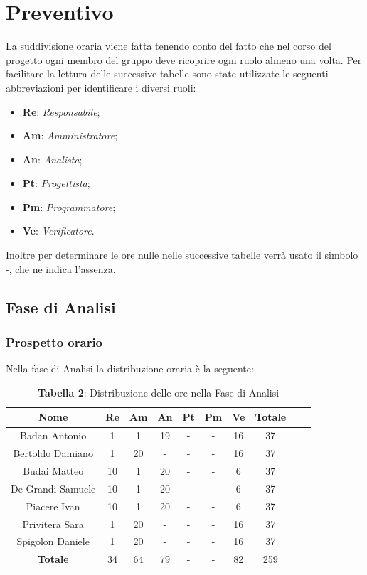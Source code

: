 \section{Preventivo}
La suddivisione oraria viene fatta tenendo conto del fatto che nel corso del progetto ogni  membro del gruppo deve ricoprire ogni ruolo almeno una volta.
Per facilitare la lettura delle successive tabelle sono state utilizzate le seguenti abbreviazioni per identificare i diversi ruoli:
\begin{itemize}
	\item \textbf{Re}: \textit{Responsabile};
	\item \textbf{Am}: \textit{Amministratore};
	\item \textbf{An}: \textit{Analista};
	\item \textbf{Pt}: \textit{Progettista};
	\item \textbf{Pm}: \textit{Programmatore};
	\item \textbf{Ve}: \textit{Verificatore}.
\end{itemize}
Inoltre per determinare le ore nulle nelle successive tabelle verrà usato il simbolo -, che ne indica l'assenza.

\subsection{Fase di Analisi}
\subsubsection{Prospetto orario}
Nella fase di Analisi la distribuzione oraria è la seguente:
\begin{table}[H]
	\centering
	\renewcommand{\arraystretch}{1.5}
	\begin{tabular}{|c|c|c|c|c|c|c|c|c|c|}
		\hline
		\rowcolor{lighter-grayer}
Nome & Re & Am & An & Pt & Pm & Ve & Totale \\ \hline
Badan Antonio & 1 & 1 & 19 & - & - & 16 & 37 \\ \hline
Bertoldo Damiano & 1 & 20 & - & - & - & 16 & 37 \\ \hline
Budai Matteo & 10 & 1 & 20 & - & - & 6 & 37 \\ \hline
De Grandi Samuele & 10 & 1 & 20 & - & - & 6 & 37 \\ \hline
Piacere Ivan & 10 & 1 & 20 & - & - & 6 & 37 \\ \hline
Privitera Sara & 1 & 20 & - & - & - & 16 & 37 \\ \hline
Spigolon Daniele & 1 & 20 & - & - & - & 16 & 37 \\ \hline
\textbf{Totale} & 34 & 64 & 79 & - & - & 82 & 259 \\ \hline
		
\end{tabular}
\caption*{\textbf{Tabella 2}: Distribuzione delle ore nella Fase di Analisi\\}
\end{table}	

